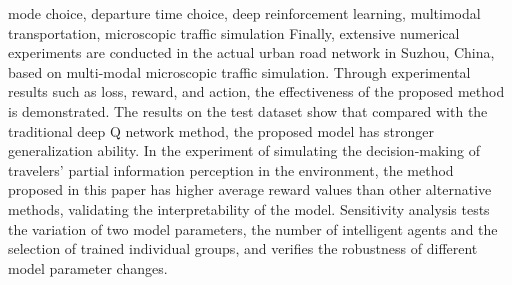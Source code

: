 \begin{englishabstract}{mode choice, departure time choice, deep reinforcement learning, multimodal transportation, microscopic traffic simulation}
Finally, extensive numerical experiments are conducted in the actual urban road network in Suzhou, China, based on multi-modal microscopic traffic simulation. Through experimental results such as loss, reward, and action, the effectiveness of the proposed method is demonstrated. The results on the test dataset show that compared with the traditional deep Q network method, the proposed model has stronger generalization ability. In the experiment of simulating the decision-making of travelers' partial information perception in the environment, the method proposed in this paper has higher average reward values than other alternative methods, validating the interpretability of the model. Sensitivity analysis tests the variation of two model parameters, the number of intelligent agents and the selection of trained individual groups, and verifies the robustness of different model parameter changes.
\end{englishabstract}
